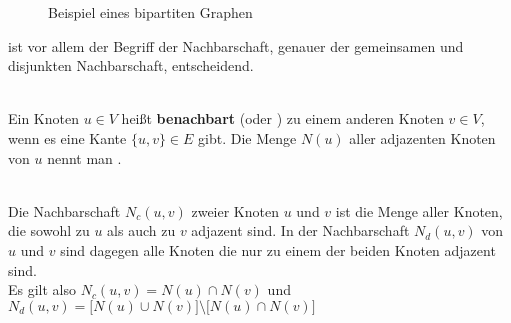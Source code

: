 \begin{figure}
\centering
{}
\caption{Beispiel eines bipartiten Graphen}
\label{fig:beispiel_bipartit}
\end{figure}
 ist vor allem der Begriff der Nachbarschaft, genauer der gemeinsamen und disjunkten 
Nachbarschaft, entscheidend.
\begin{definition}[Nachbarschaft]~\\
Ein Knoten $u \in V$ heißt \textbf{benachbart} (oder ) zu einem 
anderen Knoten $v \in V$, wenn es eine Kante $\{u,v\} \in E $ gibt. Die Menge $N(u)$ aller adjazenten Knoten
von $u$ nennt man .
\end{definition}
\begin{definition}~\\
	Die  Nachbarschaft $N_{c}(u,v)$ zweier Knoten $u$ und $v$ ist die Menge aller Knoten, die sowohl
	zu $u$ als auch zu $v$ adjazent sind. In der  Nachbarschaft $N_{d}(u,v)$ von $u$ und $v$ sind dagegen 
	alle Knoten die nur zu einem der beiden Knoten adjazent sind. \\
	Es gilt also $N_{c}(u,v) = N(u) \cap N(v)$ und $N_{d}(u,v) = \big[N(u) \cup N(v)\big]\setminus \big[N(u) \cap N(v) \big]$
\end{definition}
